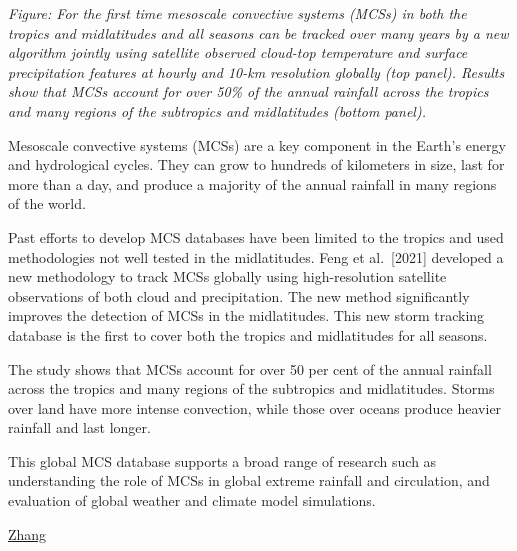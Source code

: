 \documentclass[
]{book}
\begin{document}
\emph{Figure: For the first time mesoscale convective systems (MCSs) in both the tropics and midlatitudes and all seasons can be tracked over many years by a new algorithm jointly using satellite observed cloud-top temperature and surface precipitation features at hourly and 10-km resolution globally (top panel). Results show that MCSs account for over 50\% of the annual rainfall across the tropics and many regions of the subtropics and midlatitudes (bottom panel).}

Mesoscale convective systems (MCSs) are a key component in the Earth's energy and hydrological cycles. They can grow to hundreds of kilometers in size, last for more than a day, and produce a majority of the annual rainfall in many regions of the world.

Past efforts to develop MCS databases have been limited to the tropics and used methodologies not well tested in the midlatitudes. Feng et al.~{[}2021{]} developed a new methodology to track MCSs globally using high-resolution satellite observations of both cloud and precipitation. The new method significantly improves the detection of MCSs in the midlatitudes. This new storm tracking database is the first to cover both the tropics and midlatitudes for all seasons.

The study shows that MCSs account for over 50 per cent of the annual rainfall across the tropics and many regions of the subtropics and midlatitudes. Storms over land have more intense convection, while those over oceans produce heavier rainfall and last longer.

This global MCS database supports a broad range of research such as understanding the role of MCSs in global extreme rainfall and circulation, and evaluation of global weather and climate model simulations.

\href{https://eos.org/editor-highlights/new-global-mesoscale-convective-system-tracking-database}{Zhang}
\end{document}
